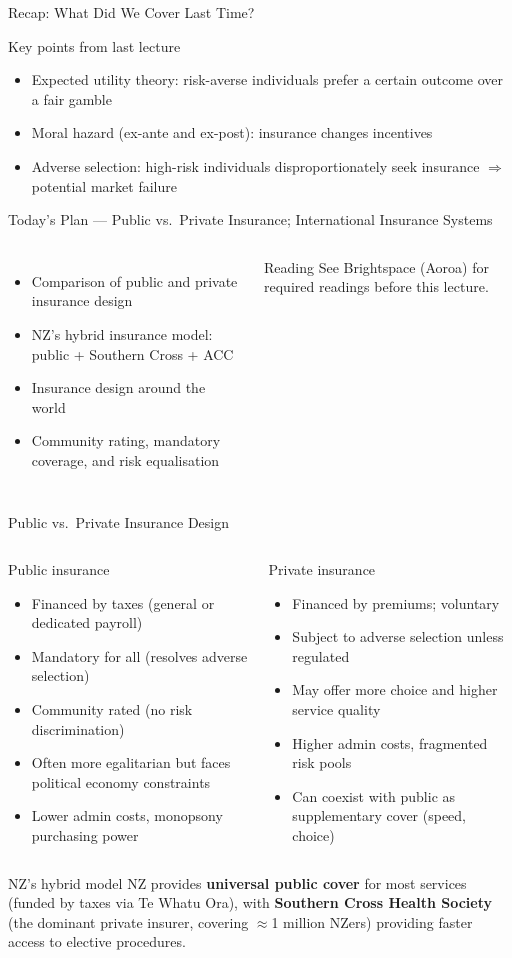 \documentclass[aspectratio=169, 12pt]{beamer}
\newcommand{\recapslide}[1]{%
  \begin{frame}{Recap: What Did We Cover Last Time?}
    \begin{block}{Key points from last lecture}
      \begin{itemize}#1\end{itemize}
    \end{block}
  \end{frame}}
\newcommand{\planslide}[2]{%
  \begin{frame}{Today's Plan — #1}
    \begin{columns}
      \column{0.6\textwidth}
      \begin{itemize}#2\end{itemize}
      \column{0.38\textwidth}
      \begin{alertblock}{Reading}
        \footnotesize See Brightspace (Aoroa) for required readings before this lecture.
      \end{alertblock}
    \end{columns}
  \end{frame}}
\begin{document}
\recapslide{
  \item Expected utility theory: risk-averse individuals prefer a certain outcome over a fair gamble
  \item Moral hazard (ex-ante and ex-post): insurance changes incentives
  \item Adverse selection: high-risk individuals disproportionately seek insurance $\Rightarrow$ potential market failure
}

\planslide{Public vs.\ Private Insurance; International Insurance Systems}{
  \item Comparison of public and private insurance design
  \item NZ's hybrid insurance model: public + Southern Cross + ACC
  \item Insurance design around the world
  \item Community rating, mandatory coverage, and risk equalisation
}

\begin{frame}{Public vs.\ Private Insurance Design}
  \begin{columns}
      \begin{block}{Public insurance}
        \begin{itemize}
          \item Financed by taxes (general or dedicated payroll)
          \item Mandatory for all (resolves adverse selection)
          \item Community rated (no risk discrimination)
          \item Often more egalitarian but faces political economy constraints
          \item Lower admin costs, monopsony purchasing power
        \end{itemize}
      \end{block}
      \begin{alertblock}{Private insurance}
        \begin{itemize}
          \item Financed by premiums; voluntary
          \item Subject to adverse selection unless regulated
          \item May offer more choice and higher service quality
          \item Higher admin costs, fragmented risk pools
          \item Can coexist with public as supplementary cover (speed, choice)
        \end{itemize}
      \end{alertblock}
  \end{columns}
  \vspace{0.4em}
  \begin{exampleblock}{NZ's hybrid model}
    NZ provides \textbf{universal public cover} for most services (funded by taxes via
    Te Whatu Ora), with \textbf{Southern Cross Health Society} (the dominant private insurer,
    covering $\approx$1 million NZers) providing faster access to elective procedures.
  \end{exampleblock}
\end{frame}
\end{document}

